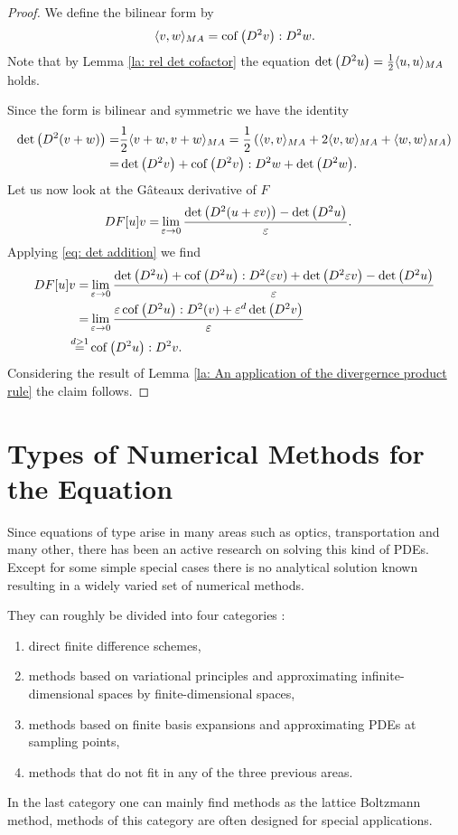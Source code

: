	\begin{proof}
	We define the \MA bilinear form by
	\[
	 \langle v, w \rangle_{MA} = \operatorname{cof} \left( D^2 v \right):D^2w.
	\]
	Note that by Lemma \ref{la: rel det cofactor} the equation $\det{\left(D^2 u\right)} = \frac 1 2  \langle u, u \rangle_{MA}$ holds.
	
	Since the \MA form is bilinear and symmetric we have the identity
	\begin{align}
		\det{\left(D^2 (v+w)\right)} =& \frac 1 2  \langle v+w, v+w \rangle_{MA} = \frac 1 2 \left( \langle v, v \rangle_{MA} + 2  \langle v, w \rangle_{MA} +  \langle w, w \rangle_{MA} \right) \nonumber\\
		=&  \det{\left(D^2 v\right)}  + \operatorname{cof} \left( D^2 v \right) : D^2 w + \det{\left(D^2 w\right)}. \label{eq: det addition}
	\end{align}
	 Let us now look at the G\^ateaux derivative of $F$
		\begin{align*}
			DF[u]v =& \lim\limits_{\varepsilon \rightarrow 0} \frac { \det{\left(D^2(u+\varepsilon v)\right)} - \det{\left(D^2u\right)}}\varepsilon.
			\end{align*}
Applying \eqref{eq: det addition} we find
		\begin{align*}
			DF[u]v =& \lim\limits_{\varepsilon \rightarrow 0} 
										\frac  {\det{\left(D^2 u\right)} + \operatorname{cof} \left( D^2 u \right) : D^2(\varepsilon v) + \det{\left(D^2 \varepsilon v\right)} - \det{\left(D^2 u\right)}}
													\varepsilon\\ 
			 =& \lim\limits_{\varepsilon \rightarrow 0} 
										\frac  {\varepsilon \operatorname{cof} \left( D^2 u \right) : D^2(v) + \varepsilon^d \det{\left(D^2 v\right)}}
													\varepsilon\\ 
			\stackrel{d > 1} =& \operatorname{cof} \left( D^2 u \right):D^2v.
		\end{align*}
Considering the result of Lemma \ref{la: An application of the divergernce product rule} the claim follows.
	\end{proof}	


\section{Types of Numerical Methods for the \MA Equation}
Since equations of \MA type arise in many areas such as optics, transportation and many other, there has been an active research on solving this kind of PDEs. Except for some simple special cases there is no analytical solution known resulting in a widely varied set of numerical methods.

They can roughly be divided into four categories \cite[p. 210]{FGN2013}: 
\begin{enumerate}
	\item direct finite difference schemes,
	\item methods based on variational principles and approximating infinite-dimensional spaces by finite-dimensional spaces,
	\item methods based on finite basis expansions and approximating PDEs at sampling points,
	\item methods that do not fit in any of the three previous areas.
\end{enumerate}
In the last category one can mainly find methods as the lattice Boltzmann method, methods of this category are often designed for special applications.

